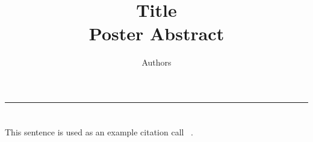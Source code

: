 \documentclass[11pt, letterpaper]{article}
\title{Title
        \\ \vspace{0.5em}  Poster Abstract}
\author{Authors}
\renewcommand *\footnoterule{}
\begin{document}
	\maketitle
	\hrule

\section * {}
\doublespacing


This sentence is used as an example citation call ~\cite{call_tag}.




\end{document}

